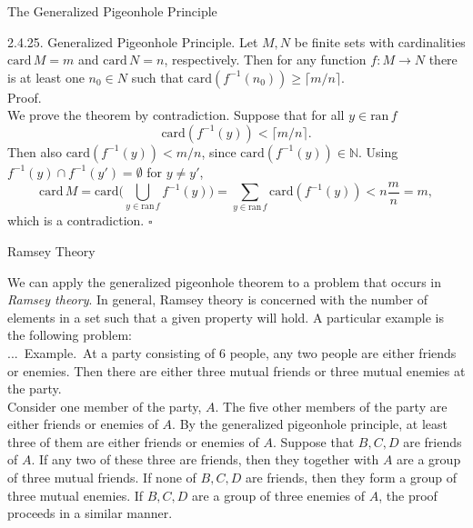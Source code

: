\documentclass[smaller,hyperref={CJKbookmarks=true}]{beamer}
\newcommand{\N}{\mathbb{N}} \newcommand{\Z}{\mathbb{Z}} \newcommand{\Q}{\mathbb{Q}}
\newenvironment{PROOF}{{\noindent\!\sf\alert{Proof.}}\\}{\hfill$\square$\\}
\newcounter{zhuo}[subsection]
\renewcommand{\thezhuo}{\thesection.\thesubsection.\arabic{zhuo}}
\newenvironment{EXAMPLE}{\stepcounter{zhuo}\alert{\!\thezhuo.~Example.\,}}{}
\begin{document}
\begin{frame}[t]{The Generalized Pigeonhole Principle}
\begin{spacing}{1.05}
\alert{2.4.25. Generalized Pigeonhole Principle.} Let $M,N$ be finite sets with cardinalities $\text{card}\,M=m$ and $\text{card}\,N=n$, respectively. Then for any function $f:M\to N$ there is at least one $n_0\in N$ such that $\text{card}(f^{-1}(n_0))\geq\lceil m/n\rceil$.\\[6pt]
\begin{PROOF}
We prove the theorem by contradiction. Suppose that for all $y\in\text{ran}\,f$
\[\text{card}(f^{-1}(y))<\lceil m/n\rceil.\]
Then also $\text{card}(f^{-1}(y))<m/n$, since $\text{card}(f^{-1}(y))\in\N$. Using $f^{-1}(y)\cap f^{-1}(y')=\emptyset$ for $y\neq y'$,
\[\text{card}\,M=\text{card}\bigg(\bigcup_{y\in\text{ran}\,f}f^{-1}(y)\bigg)=
\sum_{y\in\text{ran}\,f}\text{card}(f^{-1}(y))<n\frac{m}{n}=m,\]
which is a contradiction.
\end{PROOF}
\end{spacing}
\end{frame}
\begin{frame}[t]{Ramsey Theory}
\begin{spacing}{1.1}
We can apply the generalized pigeonhole theorem to a problem that occurs
in \emph{Ramsey theory}. In general, Ramsey theory is concerned with the
number of elements in a set such that a given property will hold. A
particular example is the following problem:\\[5pt]
\begin{EXAMPLE}
At a party consisting of 6 people, any two people are
either friends or enemies. Then there are either three mutual friends or
three mutual enemies at the party.\\[6pt]
Consider one member of the party, $A$. The five other members of the party
are either friends or enemies of $A$. By the generalized pigeonhole principle,
at least three of them are either friends or enemies of $A$. Suppose that
$B, C,D$ are friends of $A$. If any two of these three are friends, then they
together with $A$ are a group of three mutual friends. If none of $B, C,D$ are
friends, then they form a group of three mutual enemies.
If $B, C,D$ are a group of three enemies of $A$, the proof proceeds in a
similar manner.
\end{EXAMPLE}
\end{spacing}
\end{frame}
\end{document}
